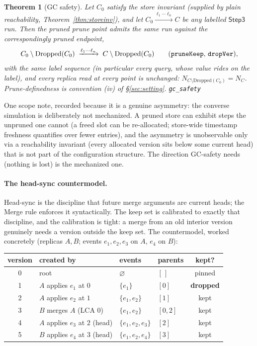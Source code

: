\documentclass[11pt]{article}
\newtheorem{theorem}{Theorem}[section]
\newcommand{\lean}[1]{\texttt{#1}}
\begin{document}
\begin{theorem}[GC safety]
\label{thm:gcsafety}
Let $C_0$ satisfy the store invariant (supplied by plain reachability,
Theorem~\ref{thm:storeinv}), and let
$C_0 \xrightarrow{\ell_1 \cdots \ell_n} C$ be any labelled
$\mathsf{Step3}$ run. Then the pruned prune point admits the same run
against the correspondingly pruned endpoint,
\[
  C_0 \setminus \mathrm{Dropped}(C_0)
  \;\xrightarrow{\ell_1 \cdots \ell_n}\;
  C \setminus \mathrm{Dropped}(C_0)
  \qquad\text{(\lean{pruneKeep}, \lean{dropVer}),}
\]
with the same label sequence (in particular every query, whose value
rides on the label), and every replica read at every point is unchanged:
$N_{C \setminus \mathrm{Dropped}(C_0)} = N_C$. Prune-definedness is
convention (iv) of \S\ref{sec:setting}.
\hfill\lean{gc\_safety}
\end{theorem}

One scope note, recorded because it is a genuine asymmetry: the
converse simulation is deliberately not mechanized. A pruned store can
exhibit steps the unpruned one cannot (a freed slot can be
re-allocated; store-wide timestamp freshness quantifies over fewer
entries), and the asymmetry is unobservable only via a reachability
invariant (every allocated version sits below some current head) that
is not part of the configuration structure. The direction GC-safety
needs (nothing is lost) is the mechanized one.

\paragraph{The head-sync countermodel.} Head-sync is the discipline
that future merge arguments are current heads; the Merge rule enforces
it syntactically. The keep set is calibrated to exactly that
discipline, and the calibration is tight: a merge from an old interior
version genuinely needs a version outside the keep set. The
countermodel, worked concretely (replicas $A, B$; events
$e_1, e_2, e_3$ on $A$, $e_4$ on $B$):

\begin{center}\small
\begin{tabular}{@{}clllc@{}}
\toprule
version & created by & events & parents & kept? \\
\midrule
0 & root & $\varnothing$ & $[\,]$ & pinned \\
1 & $A$ applies $e_1$ at $0$ & $\{e_1\}$ & $[0]$ & \textbf{dropped} \\
2 & $A$ applies $e_2$ at $1$ & $\{e_1,e_2\}$ & $[1]$ & kept \\
3 & $B$ merges $A$ (LCA $0$) & $\{e_1,e_2\}$ & $[0,2]$ & kept \\
4 & $A$ applies $e_3$ at $2$ (head) & $\{e_1,e_2,e_3\}$ & $[2]$ & kept \\
5 & $B$ applies $e_4$ at $3$ (head) & $\{e_1,e_2,e_4\}$ & $[3]$ & kept \\
\bottomrule
\end{tabular}
\end{center}
\end{document}
